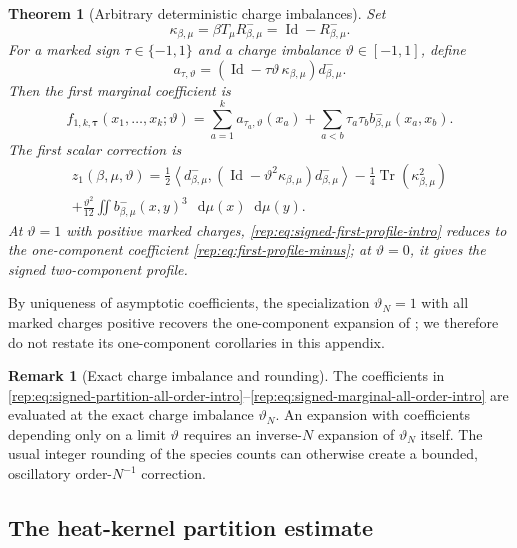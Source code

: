 \documentclass[11pt,reqno]{amsart}
\numberwithin{equation}{section}
\theoremstyle{plain}
\newtheorem{thm}{Theorem}[section]
\theoremstyle{definition}
\newtheorem{remark}[remark]{Remark}
\newcommand{\dd}{\mathop{}\!\mathrm d}
\newcommand{\Id}{\operatorname{Id}}
\newcommand{\Tr}{\operatorname{Tr}}
\newcommand{\be}{\beta}
\begin{document}
\begin{thm}[Arbitrary deterministic charge imbalances]
Set
\begin{equation}\label{rep:eq:kappa-intro}
 \kappa_{\be,\mu}=\be T_\mu R^-_{\be,\mu}=\Id-R^-_{\be,\mu}.
\end{equation}
For a marked sign $\tau\in\{-1,1\}$ and a charge imbalance $\vartheta\in[-1,1]$, define
\begin{equation}\label{rep:eq:species-singleton-intro}
 a_{\tau,\vartheta}
 =\left(\Id-\tau\vartheta\,\kappa_{\be,\mu}\right)d^-_{\be,\mu}.
\end{equation}
Then the first marginal coefficient is
\begin{equation}\label{rep:eq:signed-first-profile-intro}
 f_{1,k,\boldsymbol\tau}(x_1,\ldots,x_k;\vartheta)
 =\sum_{a=1}^k a_{\tau_a,\vartheta}(x_a)
 +\sum_{a<b}\tau_a\tau_b b^-_{\be,\mu}(x_a,x_b).
\end{equation}
The first scalar correction is
\begin{multline}\label{rep:eq:signed-z1-intro}
 z_1(\be,\mu,\vartheta)
 =\frac12\left\langle d^-_{\be,\mu},
 (\Id-\vartheta^2\kappa_{\be,\mu})d^-_{\be,\mu}\right\rangle
 -\frac14\Tr(\kappa_{\be,\mu}^2)\\
 +\frac{\vartheta^2}{12}
 \iint b^-_{\be,\mu}(x,y)^3\,\dd\mu(x)\dd\mu(y).
\end{multline}
At $\vartheta=1$ with positive marked charges, \eqref{rep:eq:signed-first-profile-intro} reduces to the one-component coefficient \eqref{rep:eq:first-profile-minus}; at $\vartheta=0$, it gives the signed two-component profile.
\end{thm}

By uniqueness of asymptotic coefficients, the specialization $\vartheta_N=1$ with all marked charges positive recovers the one-component expansion of ; we therefore do not restate its one-component corollaries in this appendix.

\begin{remark}[Exact charge imbalance and rounding]\label{rep:rem:exact-fraction}
The coefficients in \eqref{rep:eq:signed-partition-all-order-intro}--\eqref{rep:eq:signed-marginal-all-order-intro} are evaluated at the exact charge imbalance $\vartheta_N$.  An expansion with coefficients depending only on a limit $\vartheta$ requires an inverse-$N$ expansion of $\vartheta_N$ itself.  The usual integer rounding of the species counts can otherwise create a bounded, oscillatory order-$N^{-1}$ correction.
\end{remark}

\subsection{The heat-kernel partition estimate}\label{rep:sec:heat-route}
\end{document}
